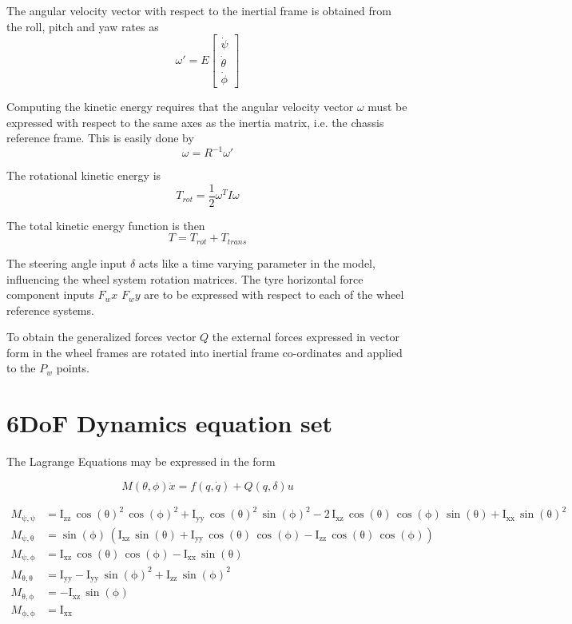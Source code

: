 The angular velocity vector with respect to the inertial frame is obtained from the roll, pitch and yaw rates as
$$
\omega' = E\begin{bmatrix}
\dot\psi \\
\dot\theta \\
\dot\phi
\end{bmatrix}
$$

Computing the kinetic energy requires that the angular velocity vector $\omega$ must be expressed with respect to the same axes as the inertia matrix, i.e. the chassis reference frame. This is easily done by
$$\omega = R^{-1}\omega'$$

The rotational kinetic energy is
$$ T_{rot} = \frac{1}{2}\omega^T I \omega $$

The total kinetic energy function is then
$$ T = T_{rot} + T_{trans} $$

The steering angle input $\delta$ acts like a time varying parameter in the model, influencing the wheel system rotation matrices.
The tyre horizontal force component inputs $F_wx$ $F_wy$ are to be expressed with respect to each of the wheel reference systems.

To obtain the generalized forces vector $Q$ the external forces expressed in vector form in the wheel frames are rotated into inertial frame co-ordinates and applied to the $P_w$ points.

\section{6DoF Dynamics equation set}
\label{sec:6dofeq}
The Lagrange Equations may be expressed in the form

$$M(\theta,\phi)\ddot x = f(q, \dot q) + Q(q,\delta)u$$

\begin{align*}
  M_{\mathrm{\psi},\mathrm{\psi}}&=\mathrm{I_{zz}}\,{\cos\left(\mathrm{\theta}\right)}^2\,{\cos\left(\mathrm{\phi}\right)}^2+\mathrm{I_{yy}}\,{\cos\left(\mathrm{\theta}\right)}^2\,{\sin\left(\mathrm{\phi}\right)}^2-2\,\mathrm{I_{xz}}\,\cos\left(\mathrm{\theta}\right)\,\cos\left(\mathrm{\phi}\right)\,\sin\left(\mathrm{\theta}\right)+\mathrm{I_{xx}}\,{\sin\left(\mathrm{\theta}\right)}^2 \\
  M_{\mathrm{\psi},\mathrm{\theta}}&=\sin\left(\mathrm{\phi}\right)\,\left(\mathrm{I_{xz}}\,\sin\left(\mathrm{\theta}\right)+\mathrm{I_{yy}}\,\cos\left(\mathrm{\theta}\right)\,\cos\left(\mathrm{\phi}\right)-\mathrm{I_{zz}}\,\cos\left(\mathrm{\theta}\right)\,\cos\left(\mathrm{\phi}\right)\right) \\
  M_{\mathrm{\psi},\mathrm{\phi}}&=\mathrm{I_{xz}}\,\cos\left(\mathrm{\theta}\right)\,\cos\left(\mathrm{\phi}\right)-\mathrm{I_{xx}}\,\sin\left(\mathrm{\theta}\right) \\
  M_{\mathrm{\theta},\mathrm{\theta}}&=\mathrm{I_{yy}}-\mathrm{I_{yy}}\,{\sin\left(\mathrm{\phi}\right)}^2+\mathrm{I_{zz}}\,{\sin\left(\mathrm{\phi}\right)}^2 \\
  M_{\mathrm{\theta},\mathrm{\phi}}&=-\mathrm{I_{xz}}\,\sin\left(\mathrm{\phi}\right) \\
  M_{\mathrm{\phi},\mathrm{\phi}}&=\mathrm{I_{xx}}
\end{align*}


